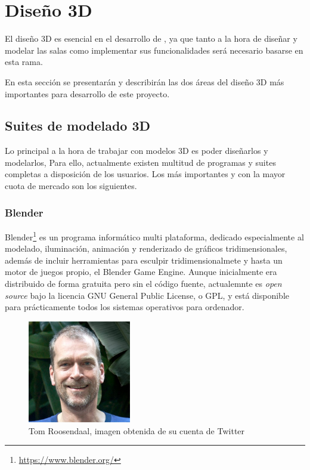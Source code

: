 \section{Diseño 3D}

El diseño 3D es esencial en el desarrollo de \MineRVa, ya que tanto a la hora de diseñar y modelar las salas como implementar sus funcionalidades será necesario basarse en esta rama.

En esta sección se presentarán y describirán las dos áreas del diseño 3D más importantes para desarrollo de este proyecto.

\subsection{Suites de modelado 3D}

Lo principal a la hora de trabajar con modelos 3D es poder diseñarlos y modelarlos, Para ello, actualmente existen multitud de programas y suites completas a disposición de los usuarios. Los más importantes y con la mayor cuota de mercado son los siguientes. 

\subsubsection{Blender}

Blender\footnote{\url{https://www.blender.org/}} es un programa informático multi plataforma, dedicado especialmente al modelado, iluminación, animación y renderizado de gráficos tridimensionales, además de incluir herramientas para esculpir tridimensionalmete y hasta un motor de juegos propio, el Blender Game Engine. Aunque inicialmente era distribuido de forma gratuita pero sin el código fuente, actualemnte es \textit{open source} bajo la licencia GNU General Public License, o GPL, y está disponible para prácticamente todos los sistemas operativos para ordenador.

\begin{figure}[!h]
\begin{center}
\includegraphics[width=0.4\textwidth]{imagenes/2/roosendaal.jpg}
\caption{Tom Roosendaal, imagen obtenida de su cuenta de Twitter}
\label{fig:roosendaal}
\end{center}
\end{figure}

